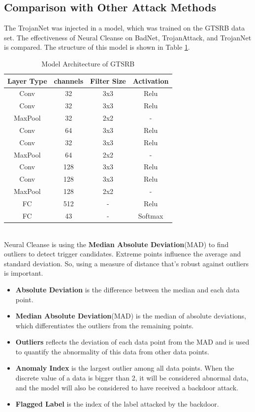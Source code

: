 \documentclass[english,version-2022-01]{uzl-thesis}
\begin{document}
\subsection{Comparison with Other Attack Methods} The TrojanNet was injected in a model, which was trained on the GTSRB data set. The effectiveness of Neural Cleanse on BadNet, TrojanAttack, and TrojanNet is compared. The structure of this model is shown in Table \ref{GTSRB}.
\begin{table}[htbp]
\centering
\caption{Model Architecture of GTSRB\cite{tang2020embarrassingly}}
\begin{tabular}{|c|c|c|c|}
\hline Layer Type & channels & Filter Size & Activation \\
\hline Conv       & 32       & 3x3         & Relu\\
\hline Conv       & 32       & 3x3         & Relu\\
\hline MaxPool    & 32       & 2x2         & -\\
\hline Conv       & 64       & 3x3         & Relu\\
\hline Conv       & 32       & 3x3         & Relu\\
\hline MaxPool    & 64       & 2x2         & -\\
\hline Conv       & 128      & 3x3         & Relu\\
\hline Conv       & 128      & 3x3         & Relu\\
\hline MaxPool    & 128      & 2x2         & -\\
\hline FC         & 512      & -           & Relu\\
\hline FC         & 43       & -           & Softmax\\
\hline 
\end{tabular}
\label{GTSRB}
\end{table}
\\
Neural Cleanse is using the \textbf{Median Absolute Deviation}(MAD) to find outliers to detect trigger candidates. Extreme points influence the average and standard deviation. So, using a measure of distance that's robust against outliers is important.\cite{PHAMGIA2001921}
\begin{itemize}
    \item \textbf{Absolute Deviation} is the difference between the median and each data point.
    \item \textbf{Median Absolute Deviation}(MAD) is the median of absolute deviations, which differentiates the outliers from the remaining points.
    \item \textbf{Outliers} reflects the deviation of each data point from the MAD and is used to quantify the abnormality of this data from other data points.
    \item \textbf{Anomaly Index} is the largest outlier among all data points. When the discrete value of a data is bigger than 2, it will be considered abnormal data, and the model will also be considered to have received a backdoor attack.
    \item \textbf{Flagged Label} is the index of the label attacked by the backdoor.
\end{itemize}
\end{document}
